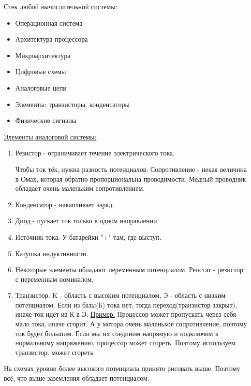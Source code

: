 Стек любой вычислительной системы:
\begin{itemize}
	\item Операционная система
	\item Архитектура процессора
	\item Микроархитектура
	\item Цифровые схемы
	\item Аналоговые цепи
	\item Элементы: транзисторы, конденсаторы
	\item Физические сигналы
\end{itemize}

\underline{Элементы аналоговой системы:}
\begin{enumerate}
	\item Резистор - ограничивает течение электрического тока. 


	Чтобы ток тёк, нужна разность потенциалов. Сопротивление  - некая величина в Омах, которая обратно пропорциональна проводимости. 
	Медный проводник обладает очень маленьким сопротивлением.
	\item Конденсатор - накапливает заряд. 
	\item Диод - пускает ток только в одном направлении. 
	\item Источник тока. У батарейки "+" там, где выступ.
	\item Катушка индуктивности.
	\item Некоторые элементы обладают переменным потенциалом.  Реостат - резистор с переменным номиналом.
	\item Транзистор.  K - область с высоким потенциалом, Э - область с низким потенциалом. Если из базы(Б) тока нет, тогда
	переход(транзистор закрыт), иначе ток идёт из К в Э. 
	\underline{Пример:}
	Процессор может пропускать через себя мало тока, иначе сгорит. А у мотора очень маленькое сопротивление, поэтому ток будет большим. Если мы их соединим напрямую и
	подключим к нормальному напряжению, процессор может сгореть. Поэтому используем транзистор.
	может сгореть 
\end{enumerate}

На схемах уровни более высокого потенциала принято рисовать выше. Поэтому всё, что выше заземления обладает потенциалом.


